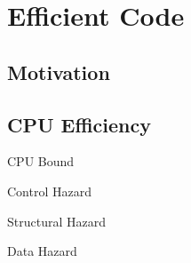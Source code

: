 \chapter{Efficient Code}

\section{Motivation}

\section{CPU Efficiency}
\begin{definitionbox}{CPU Bound}
    \unfinished
\end{definitionbox}


\begin{tcbraster}[raster columns=2,raster equal height]
\begin{definitionbox}{Control Hazard}
    \unfinished
\end{definitionbox}
\begin{definitionbox}{Structural Hazard}
    \unfinished
\end{definitionbox}
\begin{definitionbox}{Data Hazard}
    \unfinished
\end{definitionbox}
\end{tcbraster}















